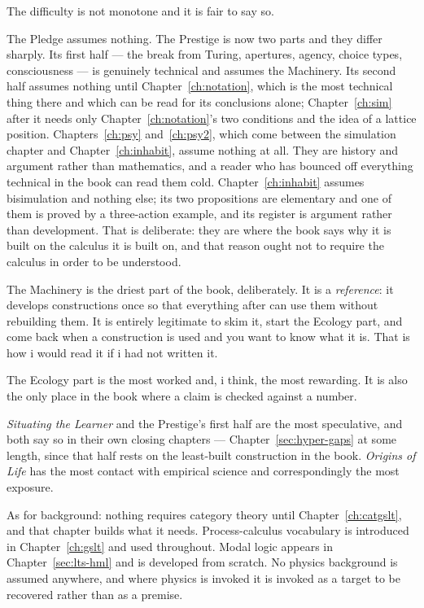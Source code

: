 The difficulty is not monotone and it is fair to say so.

The Pledge assumes nothing.
The Prestige is now two parts and they differ sharply.
Its first half --- the break from Turing, apertures, agency, choice
types, consciousness --- is genuinely technical and assumes the
Machinery.
Its second half assumes nothing until Chapter~\ref{ch:notation}, which
is the most technical thing there and which can be read for its
conclusions alone; Chapter~\ref{ch:sim} after it needs only
Chapter~\ref{ch:notation}'s two conditions and the idea of a lattice
position.
Chapters~\ref{ch:psy} and~\ref{ch:psy2}, which come between the
simulation chapter and Chapter~\ref{ch:inhabit}, assume nothing at all.
They are history and argument rather than mathematics, and a reader
who has bounced off everything technical in the book can read them
cold.
Chapter~\ref{ch:inhabit} assumes bisimulation and nothing else; its
two propositions are elementary and one of them is proved by a
three-action example, and its register is argument rather than
development.
That is deliberate: they are where the book says why it is built on
the calculus it is built on, and that reason ought not to require the
calculus in order to be understood.

The Machinery is the driest part of the book, deliberately.
It is a \emph{reference}: it develops constructions once so that
everything after can use them without rebuilding them.
It is entirely legitimate to skim it, start the Ecology part, and
come back when a construction is used and you want to know what it
is.
That is how i would read it if i had not written it.

The Ecology part is the most worked and, i think, the most
rewarding.
It is also the only place in the book where a claim is checked
against a number.

\emph{Situating the Learner} and the Prestige's first half are the most
speculative, and both say so in their own closing chapters ---
Chapter~\ref{sec:hyper-gaps} at some length, since that half rests on
the least-built construction in the book.
\emph{Origins of Life} has the most contact with empirical
science and correspondingly the most exposure.

As for background: nothing requires category theory until
Chapter~\ref{ch:catgslt}, and that chapter builds what it needs.
Process-calculus vocabulary is introduced in
Chapter~\ref{ch:gslt} and used throughout.
Modal logic appears in Chapter~\ref{sec:lts-hml} and is developed
from scratch.
No physics background is assumed anywhere, and where physics is
invoked it is invoked as a target to be recovered rather than as a
premise.

